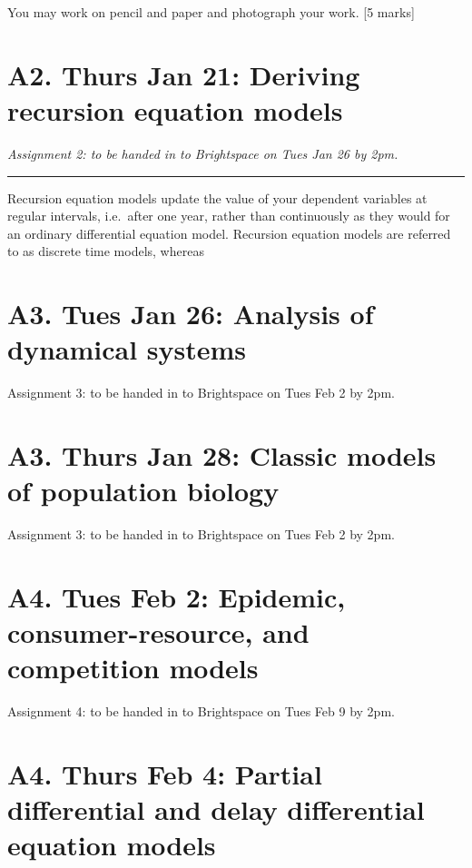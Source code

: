 \documentclass[]{book}
\begin{document}
You may work on pencil and paper and photograph your work. {[}5 marks{]}

\chapter{A2. Thurs Jan 21: Deriving recursion equation
models}\label{a2.-thurs-jan-21-deriving-recursion-equation-models}

\emph{Assignment 2: to be handed in to Brightspace on Tues Jan 26 by
2pm.}

\begin{center}\rule{0.5\linewidth}{0.5pt}\end{center}

Recursion equation models update the value of your dependent variables
at regular intervals, i.e.~after one year, rather than continuously as
they would for an ordinary differential equation model. Recursion
equation models are referred to as discrete time models, whereas

\chapter{A3. Tues Jan 26: Analysis of dynamical
systems}\label{a3.-tues-jan-26-analysis-of-dynamical-systems}

Assignment 3: to be handed in to Brightspace on Tues Feb 2 by 2pm.

\chapter{A3. Thurs Jan 28: Classic models of population
biology}\label{a3.-thurs-jan-28-classic-models-of-population-biology}

Assignment 3: to be handed in to Brightspace on Tues Feb 2 by 2pm.

\chapter{A4. Tues Feb 2: Epidemic, consumer-resource, and competition
models}\label{a4.-tues-feb-2-epidemic-consumer-resource-and-competition-models}

Assignment 4: to be handed in to Brightspace on Tues Feb 9 by 2pm.

\chapter{A4. Thurs Feb 4: Partial differential and delay differential
equation
models}\label{a4.-thurs-feb-4-partial-differential-and-delay-differential-equation-models}
\end{document}

